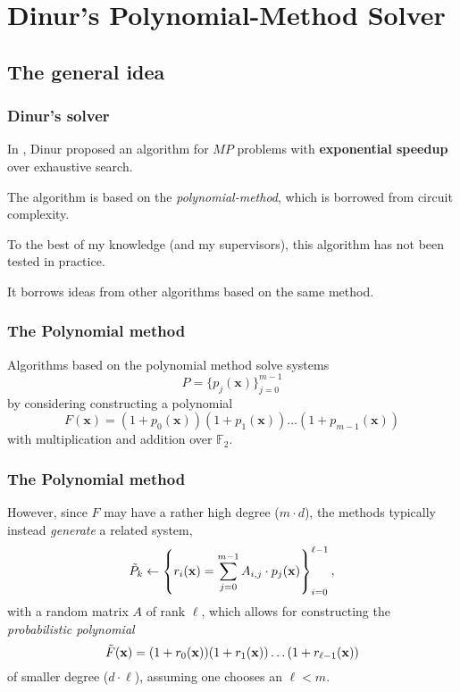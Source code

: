 \documentclass{beamer}
\newcommand{\eff}{\mathbb{F}} %
\begin{document}
\section{Dinur's Polynomial-Method Solver}

\subsection{The general idea}
\begin{frame}
    \frametitle{Dinur's solver}
    In \cite{eurocrypt-2021-30841}, Dinur proposed an algorithm for $MP$ problems with \textbf{exponential speedup} over exhaustive search.

    The algorithm is based on the \textit{polynomial-method}, which is borrowed from circuit complexity.

    To the best of my knowledge (and my supervisors), this algorithm has not been tested in practice.

    It borrows ideas from other algorithms based on the same method.
\end{frame}

\begin{frame}
    \frametitle{The Polynomial method}
    Algorithms based on the polynomial method solve systems 
    $$
        P = \{p_j(\mathbf{x})\}^{m - 1}_{j = 0}
    $$ 
    by considering constructing a polynomial 
    $$
        F(\mathbf{x}) = (1 + p_0(\mathbf{x}))(1 + p_1(\mathbf{x})) \dots (1 + p_{m - 1}(\mathbf{x}))
    $$
    with multiplication and addition over $\eff_2$. 
\end{frame}

\begin{frame}
    \frametitle{The Polynomial method}
    However, since $F$ may have a rather high degree ($m \cdot d$), the methods typically instead \textit{generate} a related system, 
    $$
        \Tilde{P}_k \gets \left\{r_i(\mathbf{x}) = \sum_{j = 0}^{m-1}A_{i,j} \cdot p_j(\mathbf{x})\right\}^{\ell - 1}_{i = 0},
    $$
    with a random matrix $A$ of rank $\ell$, which allows for constructing the \textit{probabilistic polynomial}
    $$
        \Tilde{F}(\mathbf{x}) = (1 + r_0(\mathbf{x}))(1 + r_1(\mathbf{x})) \dots (1 + r_{\ell - 1}(\mathbf{x})) 
    $$
    of smaller degree ($d \cdot \ell$), assuming one chooses an $\ell < m$.
\end{frame}
\end{document}
